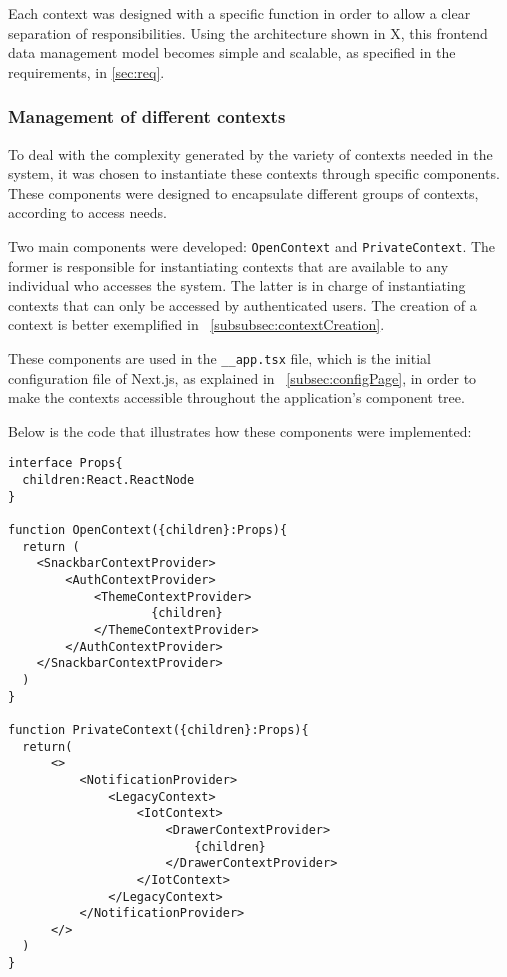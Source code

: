 Each context was designed with a specific function in order to allow a clear separation of responsibilities. Using the architecture shown in X, this frontend data management model becomes simple and scalable, as specified in the requirements, in \ref{sec:req}.

\subsubsection{Management of different contexts}\label{subsubsec:difContexts}
To deal with the complexity generated by the variety of contexts needed in the system, it was chosen to instantiate these contexts through specific components. These components were designed to encapsulate different groups of contexts, according to access needs.

Two main components were developed: \texttt{OpenContext} and \texttt{PrivateContext}. The former is responsible for instantiating contexts that are available to any individual who accesses the system. The latter is in charge of instantiating contexts that can only be accessed by authenticated users. The creation of a context is better exemplified in ~\ref{subsubsec:contextCreation}.

These components are used in the \texttt{\_\_app.tsx} file, which is the initial configuration file of Next.js, as explained in ~\ref{subsec:configPage}, in order to make the contexts accessible throughout the application's component tree.

Below is the code that illustrates how these components were implemented:

\begin{Verbatim}[fontsize=\small, baselinestretch=0.8]
interface Props{
  children:React.ReactNode
}

function OpenContext({children}:Props){
  return (
    <SnackbarContextProvider>
        <AuthContextProvider>
            <ThemeContextProvider>
                    {children}
            </ThemeContextProvider>
        </AuthContextProvider>
    </SnackbarContextProvider>
  )
}

function PrivateContext({children}:Props){
  return(
      <>
          <NotificationProvider>
              <LegacyContext>
                  <IotContext>
                      <DrawerContextProvider>
                          {children}
                      </DrawerContextProvider>
                  </IotContext>
              </LegacyContext>
          </NotificationProvider>
      </> 
  )
}
\end{Verbatim}

